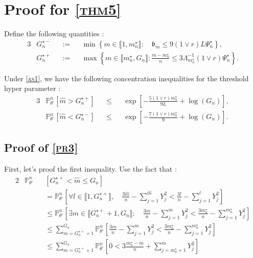 \section{Proof for \textsc{\cref{thm5}}}

\begin{de}\label{de3}
Define the following quantities :
\begin{alignat*}{3}
&G_{n}^{\star-} && := && \min\left\{m \in \llbracket 1, m_{n}^{\star} \rrbracket : \quad \mathfrak{b}_{m} \leq 9 \left(1 \vee r\right) L \Psi_{n}^{\star}\right\},\\
& G_{n}^{\star+} && := && \max \left\{m \in \llbracket m_{n}^{\star}, G_{n} \rrbracket : \frac{m - m_{n}^{\star}}{n} \leq 3 \Lambda_{m_{n}^{\star}}^{-1} \left(1 \vee r \right) \Psi_{n}^{\star}\right\}.
\end{alignat*}
\end{de}

\begin{pr}\label{pr3}
Under \textsc{\cref{as1}}, we have the following concentration inequalities for the threshold hyper parameter :
\begin{alignat*}{3}
& \mathds{P}_{\theta^{\circ}}^{n}\left[\widehat{m} > G_{n}^{\star+}\right] && \leq && \exp\left[- \frac{5 \left(1 \vee r\right) m_{n}^{\star}}{9 L} + \log \left(G_{n}\right)\right],\\
& \mathds{P}_{\theta^{\circ}}^{n}\left[\widehat{m} < G_{n}^{\star-}\right] && \leq && \exp\left[- \frac{7 \left(1 \vee r\right) m_{n}^{\star}}{9} + \log \left(G_{n}\right)\right].
\end{alignat*}
\end{pr}

\subsection{Proof of \textsc{\cref{pr3}}}
First, let's proof the first inequality.
Use the fact that : 
\begin{alignat*}{2}
& \mathds{P}_{\theta^{\circ}}^{n}&&\left[G_{n}^{\star +} < \widehat{m} \leq G_{n}\right] \\
& &&= \mathds{P}_{\theta^{\circ}}^{n} \left[\forall l \in \llbracket 1, G_{n}^{\star+}\rrbracket, \quad \frac{3 \widehat{m}}{n} - \sum\limits_{j=1}^{\widehat{m}} Y_{j}^{2} < \frac{3 l}{n} - \sum\limits_{j=1}^{l} Y_{j}^{2} \right]\\
& && \leq \mathds{P}_{\theta^{\circ}}^{n}\left[\exists m \in \llbracket G_{n}^{\star+} + 1, G_{n}\rrbracket : \quad \frac{3 m}{n} - \sum\limits_{j=1}^{m} Y_{j}^{2} < \frac{3 m_{n}^{\star}}{n} - \sum\limits_{j=1}^{m_{n}^{\star}} Y_{j}^{2} \right]\\
& && \leq \sum\limits_{m = G_{n}^{\star+} + 1}^{G_{n}} \mathds{P}_{\theta^{\circ}}^{n}\left[\frac{3 m}{n} - \sum\limits_{j=1}^{m} Y_{j}^{2} < \frac{3 m_{n}^{\star}}{n} - \sum\limits_{j=1}^{m_{n}^{\star}} Y_{j}^{2}\right]\\
& && \leq \sum\limits_{m = G_{n}^{\star+} + 1}^{G_{n}} \mathds{P}_{\theta^{\circ}}^{n}\left[0 <  3 \frac{m_{n}^{\star} - m}{n} + \sum\limits_{j = m_{n}^{\star} + 1}^{m} Y_{j}^{2}\right]
\end{alignat*}


